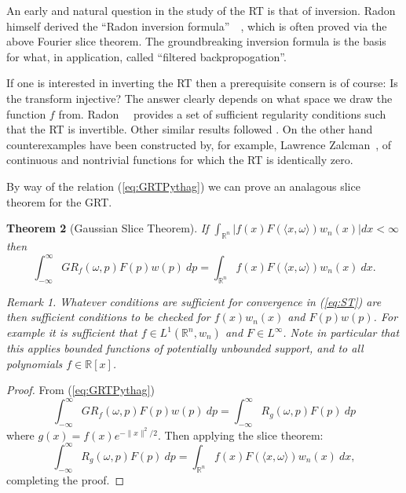 \documentclass{amsart}
\newtheorem{theorem}{Theorem}[section]
\theoremstyle{remark}
\newtheorem{remark}[theorem]{Remark}
\numberwithin{equation}{section}
\newcommand{\RR}{\mathbb{R}}
\begin{document}
An early and natural question in the study of the RT is that of inversion. Radon himself derived the ``Radon inversion formula''~\cite{Rado17}~\cite{Rado86}, which is often proved via the above Fourier slice theorem. The groundbreaking inversion formula is the basis for what, in application, called ``filtered backpropogation''.

If one is interested in inverting the RT then a prerequisite consern is of course: Is the transform injective? The answer clearly depends on what space we draw the function $f$ from. Radon~\cite{Rado17}~\cite{Rado86} provides a set of sufficient regularity conditions such that the RT is invertible. Other similar results followed \cite{????}. On the other hand counterexamples have been constructed by, for example, Lawrence Zalcman~\cite{Zalc82}, of continuous and nontrivial functions for which the RT is identically zero.

By way of the relation (\ref{eq:GRTPythag}) we can prove an analagous slice theorem for the GRT.\@
\begin{theorem}[Gaussian Slice Theorem] If $\int_{\mathbb{R}^n} |f(x) F(\langle x, \omega\rangle) w_n(x)| dx < \infty$ then
\begin{equation}\label{eq:GST}
    \int_{-\infty}^\infty GR_f(\omega, p)F(p) w(p) ~dp
    = \int_{\mathbb{R}^n}f(x) F(\langle x, \omega\rangle) w_n(x) ~dx. 
\end{equation}
\begin{remark}
Whatever conditions are sufficient for convergence in (\ref{eq:ST}) are then sufficient conditions to be checked for $f(x)w_n(x)$ and $F(p)w(p)$. For example it is sufficient that $f \in L^1(\RR^n, w_n)$ and $F \in L^\infty$. Note in particular that this applies bounded functions of potentially unbounded support, and to all polynomials $f \in \RR[x]$.
\end{remark}
\end{theorem}
\begin{proof}
From (\ref{eq:GRTPythag})
\[
    \int_{-\infty}^\infty GR_f(\omega, p)F(p) w(p) ~dp 
    = \int_{-\infty}^\infty R_g(\omega, p) F(p) ~dp
\]
where $g(x) = f(x)e^{-\|x\|^2/2}$. Then applying the slice theorem:
\[
    \int_{-\infty}^\infty R_g(\omega, p) F(p) ~dp 
    = \int_{\RR^n} f(x)F(\langle x, \omega \rangle) w_n(x) ~dx,
\]
completing the proof.
\end{proof}

\end{document}

